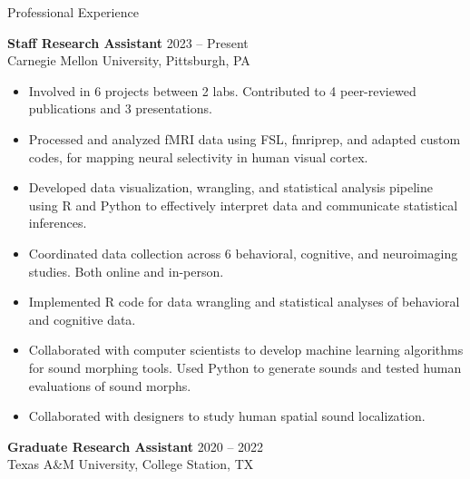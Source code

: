 \documentclass{resume} %
\begin{document}
    \begin{rSection}{Professional Experience}
        
        {\textbf{Staff Research Assistant} \hfill {2023 -- Present}
            \\ {Carnegie Mellon University, Pittsburgh, PA}}
        
        \begin{itemize}[nosep, leftmargin=*, widest=0]
            \item Involved in 6 projects between 2 labs. Contributed to 4 
            peer-reviewed publications and 3 
            presentations.
            \item Processed and analyzed fMRI data using FSL, 
            fmriprep, and adapted custom codes, for mapping neural selectivity 
            in human visual cortex.
            \item Developed data visualization, wrangling, and statistical 
            analysis pipeline using R and 
            Python to effectively interpret data and communicate statistical 
            inferences.
            \item Coordinated data collection across 6 behavioral, cognitive, 
            and neuroimaging studies. Both online and in-person.
            \item Implemented R code for data wrangling and statistical 
            analyses of behavioral and cognitive data.
            \item Collaborated with computer scientists to develop machine 
            learning algorithms for sound morphing tools. Used Python to 
            generate sounds and tested human evaluations of sound morphs.
            \item Collaborated with designers to study human spatial sound 
            localization.
        \end{itemize}
        
        {\textbf{Graduate Research Assistant} \hfill {2020 -- 2022}
            \\ {Texas A\&M University, College Station, TX}}
        

\end{rSection}
\end{document}
